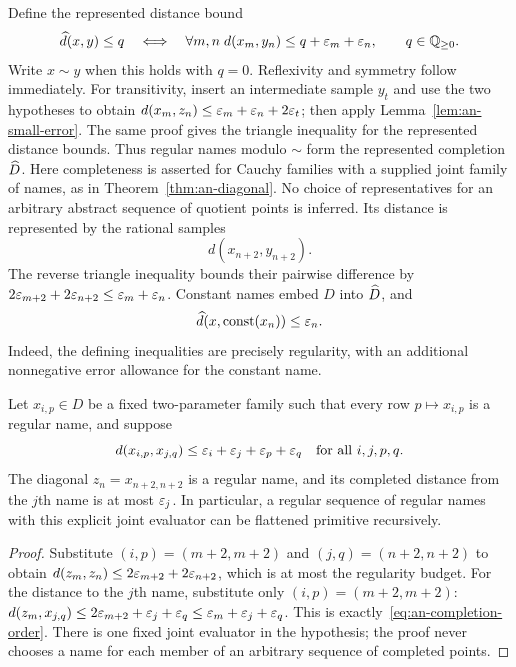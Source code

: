 Define the represented distance bound
\begin{equation}
 \widehat d(x,y)\le q
 \quad\Longleftrightarrow\quad
 \forall m,n\;
 d(x_m,y_n)\le q+\varepsilon_m+\varepsilon_n,
 \qquad q\in\mathbb Q_{\ge0}.
 \label{eq:an-completion-order}
\end{equation}
Write $x\sim y$ when this holds with $q=0$.  Reflexivity and symmetry
follow immediately.  For transitivity, insert an intermediate sample
$y_t$ and use the two hypotheses to obtain
$d(x_m,z_n)\le\varepsilon_m+\varepsilon_n+2\varepsilon_t$; then apply
Lemma~\ref{lem:an-small-error}.  The same proof gives the triangle
inequality for the represented distance bounds.  Thus regular names
modulo $\sim$ form the represented completion $\widehat D$.  Here
completeness is asserted for Cauchy families with a supplied joint family
of names, as in Theorem~\ref{thm:an-diagonal}.  No choice of representatives
for an arbitrary abstract sequence of quotient points is inferred.
Its distance is
represented by the rational samples
\[
 d(x_{n+2},y_{n+2}).
\]
The reverse triangle inequality bounds their pairwise difference by
$2\varepsilon_{m+2}+2\varepsilon_{n+2}\le\varepsilon_m+\varepsilon_n$.
Constant names embed $D$ into $\widehat D$, and
\begin{equation}
 \widehat d(x,\operatorname{const}(x_n))\le\varepsilon_n.
 \label{eq:an-density}
\end{equation}
Indeed, the defining inequalities are precisely regularity, with an
additional nonnegative error allowance for the constant name.

\begin{theorem}
\label{thm:an-diagonal}
Let $x_{i,p}\in D$ be a fixed two-parameter family such that every
row $p\mapsto x_{i,p}$ is a regular name, and suppose
\[
 d(x_{i,p},x_{j,q})
 \le\varepsilon_i+\varepsilon_j+\varepsilon_p+\varepsilon_q
 \quad\text{for all }i,j,p,q.
\]
The diagonal $z_n=x_{n+2,n+2}$ is a regular name, and its completed
distance from the $j$th name is at most $\varepsilon_j$.  In particular, a
regular sequence of regular names with this explicit joint evaluator
can be flattened primitive recursively.
\end{theorem}

\begin{proof}
Substitute $(i,p)=(m+2,m+2)$ and $(j,q)=(n+2,n+2)$ to obtain
$d(z_m,z_n)\le2\varepsilon_{m+2}+2\varepsilon_{n+2}$, which is at most the
regularity budget.  For the distance to the $j$th name, substitute only
$(i,p)=(m+2,m+2)$:
$d(z_m,x_{j,q})\le2\varepsilon_{m+2}+\varepsilon_j+\varepsilon_q
\le\varepsilon_m+\varepsilon_j+\varepsilon_q$.
This is exactly~\eqref{eq:an-completion-order}.  There is one fixed
joint evaluator in the hypothesis; the proof never chooses a name for
each member of an arbitrary sequence of completed points.
\end{proof}

